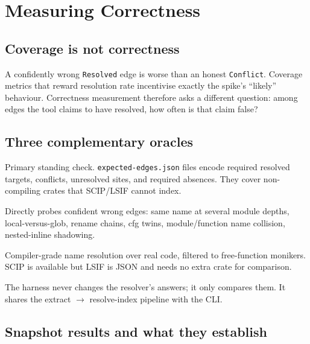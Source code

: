 \documentclass[11pt,a4paper,oneside]{report}
\newcommand{\horizon}{Horizon}
\begin{document}
\chapter{Measuring Correctness}
\label{ch:correctness}

\section{Coverage is not correctness}

A confidently wrong \texttt{Resolved} edge is worse than an honest
\texttt{Conflict}. Coverage metrics that reward resolution rate incentivise
exactly the spike's ``likely'' behaviour. Correctness measurement therefore
asks a different question: among edges the tool claims to have resolved, how
often is that claim false?

\section{Three complementary oracles}

\begin{description}[style=nextline,leftmargin=1em]
  \item[Hand-annotated fixtures.] Primary standing check.
    \texttt{expected-edges.json} files encode required resolved targets,
    conflicts, unresolved sites, and required absences. They cover
    non-compiling crates that SCIP/LSIF cannot index.
  \item[Adversarial fixture.] Directly probes confident wrong edges: same
    name at several module depths, local-versus-glob, rename chains, cfg
    twins, module/function name collision, nested-inline shadowing.
  \item[rust-analyzer LSIF on \horizon{} itself.] Compiler-grade name
    resolution over real code, filtered to free-function monikers. SCIP is
    available but LSIF is JSON and needs no extra crate for comparison.
\end{description}

The harness never changes the resolver's answers; it only compares them. It
shares the extract $\rightarrow$ resolve-index pipeline with the CLI.

\section{Snapshot results and what they establish}
\end{document}
